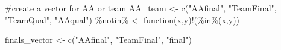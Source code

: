 \documentclass[
  letterpaper,
  DIV=11,
  numbers=noendperiod]{scrartcl}
\newenvironment{Shaded}{\begin{snugshade}}{\end{snugshade}}
\newcommand{\CommentTok}[1]{\textcolor[rgb]{0.37,0.37,0.37}{#1}}
\newcommand{\ControlFlowTok}[1]{\textcolor[rgb]{0.00,0.23,0.31}{#1}}
\newcommand{\FunctionTok}[1]{\textcolor[rgb]{0.28,0.35,0.67}{#1}}
\newcommand{\NormalTok}[1]{\textcolor[rgb]{0.00,0.23,0.31}{#1}}
\newcommand{\OtherTok}[1]{\textcolor[rgb]{0.00,0.23,0.31}{#1}}
\newcommand{\SpecialCharTok}[1]{\textcolor[rgb]{0.37,0.37,0.37}{#1}}
\newcommand{\StringTok}[1]{\textcolor[rgb]{0.13,0.47,0.30}{#1}}
\begin{document}
\begin{Shaded}
\begin{Highlighting}[]
\CommentTok{\#create a vector for AA or team}
\NormalTok{AA\_team }\OtherTok{\textless{}{-}} \FunctionTok{c}\NormalTok{(}\StringTok{"AAfinal"}\NormalTok{, }\StringTok{"TeamFinal"}\NormalTok{, }\StringTok{"TeamQual"}\NormalTok{, }\StringTok{"AAqual"}\NormalTok{)}
\StringTok{\textquotesingle{}\%notin\%\textquotesingle{}} \OtherTok{\textless{}{-}} \ControlFlowTok{function}\NormalTok{(x,y)}\SpecialCharTok{!}\NormalTok{(}\StringTok{\textquotesingle{}\%in\%\textquotesingle{}}\NormalTok{(x,y))}

\NormalTok{finals\_vector }\OtherTok{\textless{}{-}} \FunctionTok{c}\NormalTok{(}\StringTok{"AAfinal"}\NormalTok{, }\StringTok{"TeamFinal"}\NormalTok{, }\StringTok{"final"}\NormalTok{)}
\end{Highlighting}
\end{Shaded}
\end{document}
